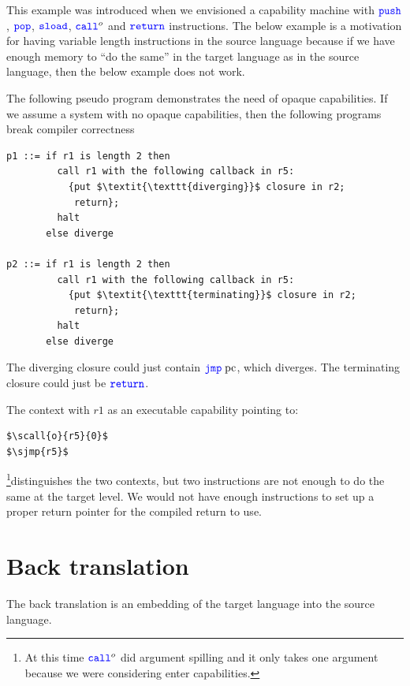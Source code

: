 \documentclass[a4paper]{article}
\begin{document}
This example was introduced when we envisioned a capability machine with $\spush{}$, $\spop{}$, $\ssload{}{}$, $\scall{o}{}{}$ and $\texttt{{\color{blue}return}}$ instructions. The below example is a motivation for having variable length instructions in the source language because if we have enough memory to ``do the same'' in the target language as in the source language, then the below example does not work.

The following pseudo program demonstrates the need of opaque capabilities. If we assume a system with no opaque capabilities, then the following programs break compiler correctness
\begin{lstlisting}[basicstyle=\sourcecolor{}\ttfamily] 
p1 ::= if r1 is length 2 then
         call r1 with the following callback in r5:
           {put $\textit{\texttt{diverging}}$ closure in r2;
            return};
         halt
       else diverge

p2 ::= if r1 is length 2 then
         call r1 with the following callback in r5:
           {put $\textit{\texttt{terminating}}$ closure in r2;
            return};
         halt
       else diverge
\end{lstlisting}
The diverging closure could just contain $\sjmp{\pcreg}$, which diverges. The terminating closure could just be $\texttt{{\color{blue}return}}$.

The context with $r1$ as an executable capability pointing to:
\begin{lstlisting}[basicstyle=\sourcecolor{}\ttfamily] 
$\scall{o}{r5}{0}$
$\sjmp{r5}$
\end{lstlisting}
\footnote{At this time $\scall{o}{}{}$ did argument spilling and it only takes one argument because we were considering enter capabilities.}distinguishes the two contexts, but two instructions are not enough to do the same at the target level. We would not have enough instructions to set up a proper return pointer for the compiled return to use.

\clearpage
\section{Back translation}
The back translation is an embedding of the target language into the source language.
\end{document}
